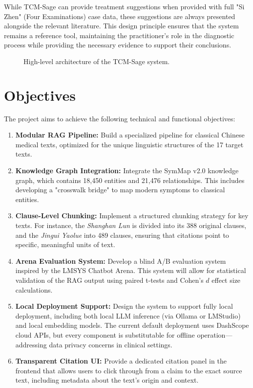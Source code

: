 \documentclass[11pt,a4paper]{report}
\begin{document}
While TCM-Sage can provide treatment suggestions when provided with full "Si Zhen" (Four Examinations) case data, these suggestions are always presented alongside the relevant literature. This design principle ensures that the system remains a reference tool, maintaining the practitioner's role in the diagnostic process while providing the necessary evidence to support their conclusions.

\begin{figure}[H]
\centering
{}
\caption{High-level architecture of the TCM-Sage system.}
\label{fig:arch}
\end{figure}

\section{Objectives}
The project aims to achieve the following technical and functional objectives:
\begin{enumerate}
    \item \textbf{Modular RAG Pipeline:} Build a specialized pipeline for classical Chinese medical texts, optimized for the unique linguistic structures of the 17 target texts.
    \item \textbf{Knowledge Graph Integration:} Integrate the SymMap v2.0 knowledge graph, which contains 18,450 entities and 21,476 relationships. This includes developing a "crosswalk bridge" to map modern symptoms to classical entities.
    \item \textbf{Clause-Level Chunking:} Implement a structured chunking strategy for key texts. For instance, the \textit{Shanghan Lun} is divided into its 388 original clauses, and the \textit{Jingui Yaolue} into 489 clauses, ensuring that citations point to specific, meaningful units of text.
    \item \textbf{Arena Evaluation System:} Develop a blind A/B evaluation system inspired by the LMSYS Chatbot Arena. This system will allow for statistical validation of the RAG output using paired t-tests and Cohen's $d$ effect size calculations.
    \item \textbf{Local Deployment Support:} Design the system to support fully local deployment, including both local LLM inference (via Ollama or LMStudio) and local embedding models. The current default deployment uses DashScope cloud APIs, but every component is substitutable for offline operation---addressing data privacy concerns in clinical settings.
    \item \textbf{Transparent Citation UI:} Provide a dedicated citation panel in the frontend that allows users to click through from a claim to the exact source text, including metadata about the text's origin and context.
\end{enumerate}
\end{document}
